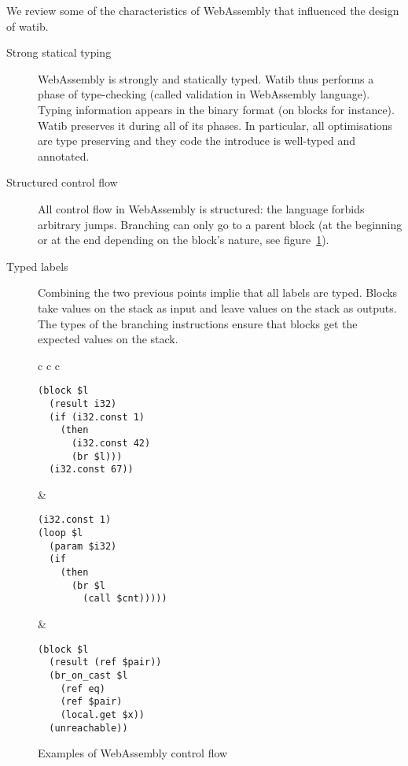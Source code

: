 \documentclass[10pt]{article}
\begin{document}
We review some of the characteristics of WebAssembly that influenced the design
of watib.

\begin{description}
\item[Strong statical typing]
WebAssembly is strongly and statically typed. Watib thus performs a phase of
type-checking (called validation in WebAssembly language). Typing information
appears in the binary format (on blocks for instance). Watib preserves it during
all of its phases. In particular, all optimisations are type preserving and they
code the introduce is well-typed and annotated.

\item[Structured control flow]
All control flow in WebAssembly is structured: the language forbids arbitrary
jumps. Branching can only go to a parent block (at the beginning or at the end
depending on the block's nature, see figure~\ref{cf-ex}).

\item[Typed labels]
Combining the two previous points implie that all labels are typed. Blocks take
values on the stack as input and leave values on the stack as outputs. The types
of the branching instructions ensure that blocks get the expected values on the
stack.
\end{description}
\begin{figure}[h]
\centering
\begin{tabular}{c c c}
\begin{minipage}{1.8in}
\begin{verbatim}
(block $l
  (result i32)
  (if (i32.const 1)
    (then
      (i32.const 42)
      (br $l)))
  (i32.const 67))
\end{verbatim}
\end{minipage}&
\begin{minipage}{1.8in}
\begin{verbatim}
(i32.const 1)
(loop $l
  (param $i32)
  (if
    (then
      (br $l
        (call $cnt)))))
\end{verbatim}
\end{minipage}
&\begin{minipage}{1.8in}
\begin{verbatim}
(block $l
  (result (ref $pair))
  (br_on_cast $l
    (ref eq)
    (ref $pair)
    (local.get $x))
  (unreachable))
\end{verbatim}
\end{minipage}
\end{tabular}
\caption{Examples of WebAssembly control flow}\label{cf-ex}
\end{figure}
\end{document}
